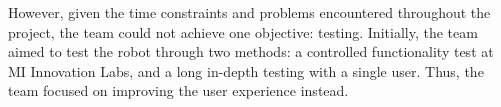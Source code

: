 However, given the time constraints and problems encountered throughout the project, the team could not achieve one objective: testing. Initially, the team aimed to test the robot through two methods: a controlled functionality test at MI Innovation Labs, and a long in-depth testing with a single user. Thus, the team focused on improving the user experience instead.
